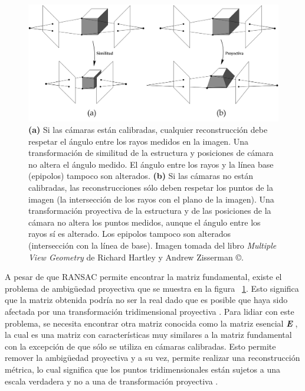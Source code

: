 \begin{figure}[H]
\centering
\includegraphics[width=1.0\textwidth]{images/projectiveambiguity1.png}
\caption[Problema de ambigüedad proyectiva]%
{\textbf{(a)} Si las c\'{a}maras est\'{a}n calibradas, cualquier reconstrucci\'{o}n debe respetar el \'{a}ngulo entre los rayos medidos en la imagen. Una transformaci\'{o}n de similitud de la estructura
y posiciones de c\'{a}mara no altera el \'{a}ngulo medido. El \'{a}ngulo entre los rayos y la l\'{i}nea base (epipolos) tampoco son alterados. \textbf{(b)} Si las c\'{a}maras no est\'{a}n calibradas, las reconstrucciones s\'{o}lo deben respetar los puntos de la imagen (la intersecci\'{o}n de los rayos con el plano de la imagen). Una transformaci\'{o}n proyectiva de la estructura y de las posiciones de la c\'{a}mara no altera los puntos medidos, aunque el \'{a}ngulo entre los rayos
s\'{i} es alterado. Los epipolos tampoco son alterados (intersecci\'{o}n con la l\'{i}nea de base). Imagen tomada del libro \textit{Multiple View Geometry} de Richard Hartley y Andrew Zisserman \copyright.}
\label{fig:ReconstructionAmbiguity}
\end{figure}


A pesar de que RANSAC permite encontrar la matriz fundamental, existe el problema de ambigüedad proyectiva que se muestra en la figura ~\ref{fig:ReconstructionAmbiguity}. Esto significa que la matriz obtenida podr\'{i}a no ser la real dado que es posible que haya sido afectada por una transformaci\'{o}n tridimensional proyectiva \cite{Hartley_Zisserman_2003}. Para lidiar con este problema, se necesita encontrar otra matriz conocida como la matriz esencial \textit{\textbf{E}} \cite{Longuet_Higgins_1981}, la cual es una matriz con caracter\'{i}sticas muy similares a la matriz fundamental con la excepci\'{o}n de que s\'{o}lo se utiliza en c\'{a}maras calibradas. Esto permite remover la ambigüedad proyectiva y a su vez, permite realizar una reconstrucci\'{o}n m\'{e}trica, lo cual significa que los puntos tridimensionales est\'{a}n sujetos a una escala verdadera y no a una de transformaci\'{o}n proyectiva \cite{Cyganek_Siebert_2009,Hartley_Zisserman_2003,Szeliski_2010}.

